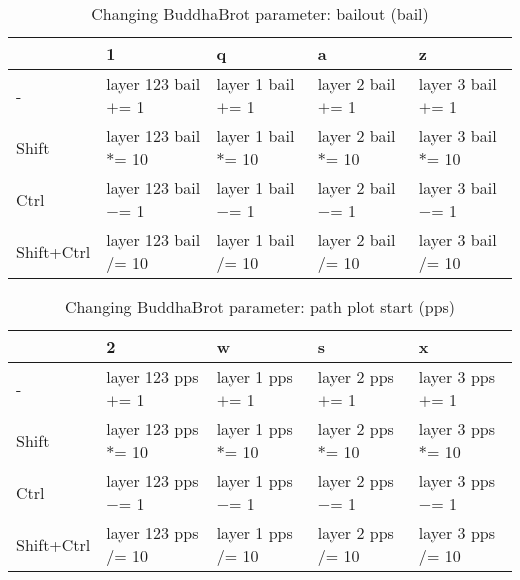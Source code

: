 \documentclass[10pt,a4paper]{article}
\begin{document}
\begin{table}[h!]
    \caption{Changing BuddhaBrot parameter: bailout (bail)}
    \setlength{\tabcolsep}{0.0pt}
    \begin{tabularx}{\linewidth}{LLLLL}
        \toprule
                   & 1                      & q                    & a                    & z                    \\
        \midrule
        -          & layer 123 bail $+$= 1  & layer 1 bail $+$= 1  & layer 2 bail $+$= 1  & layer 3 bail $+$= 1  \\
        Shift      & layer 123 bail $*$= 10 & layer 1 bail $*$= 10 & layer 2 bail $*$= 10 & layer 3 bail $*$= 10 \\
        Ctrl       & layer 123 bail $-$= 1  & layer 1 bail $-$= 1  & layer 2 bail $-$= 1  & layer 3 bail $-$= 1  \\
        Shift+Ctrl & layer 123 bail $/$= 10 & layer 1 bail $/$= 10 & layer 2 bail $/$= 10 & layer 3 bail $/$= 10 \\
        \bottomrule
    \end{tabularx}
\end{table}

\begin{table}[h!]
    \caption{Changing BuddhaBrot parameter: path plot start (pps)}
    \setlength{\tabcolsep}{0.0pt}
    \begin{tabularx}{\linewidth}{LLLLL}
        \toprule
                   & 2                      & w                    & s                    & x                    \\
        \midrule
        -          & layer 123 pps $+$= 1  & layer 1 pps $+$= 1  & layer 2 pps $+$= 1  & layer 3 pps $+$= 1  \\
        Shift      & layer 123 pps $*$= 10 & layer 1 pps $*$= 10 & layer 2 pps $*$= 10 & layer 3 pps $*$= 10 \\
        Ctrl       & layer 123 pps $-$= 1  & layer 1 pps $-$= 1  & layer 2 pps $-$= 1  & layer 3 pps $-$= 1  \\
        Shift+Ctrl & layer 123 pps $/$= 10 & layer 1 pps $/$= 10 & layer 2 pps $/$= 10 & layer 3 pps $/$= 10 \\
        \bottomrule
    \end{tabularx}
\end{table}
\end{document}
